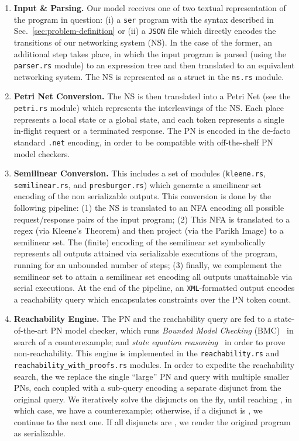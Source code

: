 \begin{enumerate}
	\item \textbf{Input \& Parsing.} Our model receives one of two textual representation of the program in question: (i) a \texttt{ser} program with the syntax described in Sec.~\ref{sec:problem-definition} or (ii) a \texttt{JSON} file which directly encodes the transitions of our networking system (NS). In the case of the former, an additional step takes place, in which the input program is parsed (using the \texttt{parser.rs} module) to an expression tree and then translated to an equivalent networking system. The NS is represented as a struct in the \texttt{ns.rs} module. 
	
	\item \textbf{Petri Net Conversion.} The NS is then translated into a Petri Net (see the \texttt{petri.rs} module) which represents the interleavings of the NS. Each place represents a local state or a global state, and each token represents a single in-flight request or a terminated response. The PN is encoded in the de-facto standard \texttt{.net} encoding, in order to be compatible with off-the-shelf PN model checkers. 
	
	\item \textbf{Semilinear Conversion.} 
	This includes a set of modules (\texttt{kleene.rs}, \texttt{semilinear.rs}, and \texttt{presburger.rs}) which generate a smeilinear set encoding of the non serializable outputs. This conversion is done by the following pipeline: (1) the NS is translated to an NFA encoding all possible request/response pairs of the input program; (2) This NFA is translated to a regex (via Kleene's Theorem) and then project (via the Parikh Image) to a semilinear set. The (finite) encoding of the semilinear set symbolically represents all outputs attained via serializable executions of the program, running for an unbounded number of steps; (3) finally, we complement the semilinear set to attain a semilinear set encoding all outputs unattainable via serial executions. At the end of the pipeline, an \texttt{XML}-formatted output encodes a reachability query which encapsulates constraints over the PN token count.
	
	
	\item \textbf{Reachability Engine.} The PN and the reachability query are fed to a state-of-the-art PN model checker, which runs \textit{Bounded Model Checking} (BMC)~\cite{BiCiClZh99} in search of a counterexample; and \textit{state equation reasoning}~\cite{Mu77} in order to prove non-reachability. This engine is implemented in the \texttt{reachability.rs} and \texttt{reachability\_with\_proofs.rs}  modules.
	In order to expedite the reachability search, the we replace the single ``large'' PN and query with multiple smaller PNs, each coupled with a sub-query encoding a separate disjunct from the original query.
	We iteratively solve the disjuncts on the fly, until reaching \sat, in which case, we have a counterexample; otherwise, if a disjunct is \unsat, we continue to the next one. If all disjuncts are \unsat, we render the original program as serializable.
	

\end{enumerate}
